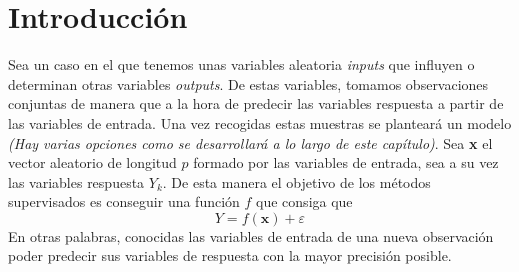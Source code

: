 \section{Introducción}
\noindent Sea un caso en el que tenemos unas variables aleatoria \textit{inputs} que influyen o determinan otras variables \textit{outputs}. De estas variables, tomamos observaciones conjuntas de manera que a la hora de predecir las variables respuesta a partir de las variables de entrada. Una vez recogidas estas muestras se planteará un modelo \textit{(Hay varias opciones como se desarrollará a lo largo de este capítulo)}.
\noindent Sea \textbf{x} el vector aleatorio de longitud $p$ formado por las variables de entrada, sea a su vez las variables respuesta $Y_k$. De esta manera el objetivo de los métodos supervisados es conseguir una función $f$ que consiga que \begin{equation}
Y=f(\textbf{x})+\varepsilon
\end{equation}
En otras palabras, conocidas las variables de entrada de una nueva observación poder predecir sus variables de respuesta con la mayor precisión posible. 
